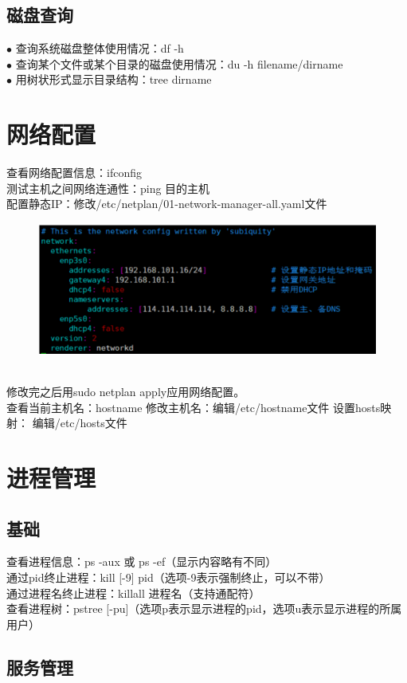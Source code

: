 \documentclass[11pt]{article}
\begin{document}
\subsection{磁盘查询}
$\bullet$ 查询系统磁盘整体使用情况：df -h  \\
$\bullet$ 查询某个文件或某个目录的磁盘使用情况：du -h filename/dirname  \\
$\bullet$ 用树状形式显示目录结构：tree dirname

\section{网络配置}
查看网络配置信息：ifconfig \\
测试主机之间网络连通性：ping 目的主机 \\
配置静态IP：修改/etc/netplan/01-network-manager-all.yaml文件 \\
\begin{figure}[htb]
    \centering
    \includegraphics[scale=0.27]{imgs/static_ip.png}
\end{figure} \\
修改完之后用sudo netplan apply应用网络配置。 \\
查看当前主机名：hostname \qquad 修改主机名：编辑/etc/hostname文件 \qquad 设置hosts映射：
编辑/etc/hosts文件

\section{进程管理}
\subsection{基础}
查看进程信息：ps -aux 或 ps -ef（显示内容略有不同）  \\
通过pid终止进程：kill [-9] pid（选项-9表示强制终止，可以不带） \\
通过进程名终止进程：killall 进程名（支持通配符） \\
查看进程树：pstree [-pu]（选项p表示显示进程的pid，选项u表示显示进程的所属用户）

\subsection{服务管理}











    
\end{document}
